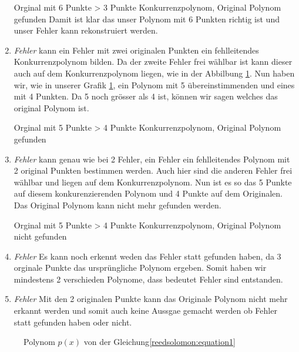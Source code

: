\begin{beispiel}
\begin{enumerate}
        \par Orginal mit 6 Punkte > 3 Punkte Konkurrenzpolynom, Original Polynom gefunden
        Damit ist klar das unser Polynom mit 6 Punkten richtig ist und unser Fehler kann rekonstruiert werden.
    \item \textit{Fehler} kann ein Fehler mit zwei originalen Punkten ein fehlleitendes Konkurrenzpolynom bilden.
        Da der zweite Fehler frei wählbar ist kann dieser auch auf dem Konkurrenzpolynom liegen, wie in der Abbilbung \ref{fig:polynom}.
        Nun haben wir, wie in unserer Grafik \ref{fig:polynom}, ein Polynom mit 5 übereinstimmenden und eines mit 4 Punkten.
        Da 5 noch grösser als 4 ist, können wir sagen welches das original Polynom ist.
        \par Orginal mit 5 Punkte > 4 Punkte Konkurrenzpolynom, Original Polynom gefunden
    \item \textit{Fehler} kann genau wie bei 2 Fehler, ein Fehler ein fehlleitendes Polynom mit 2 original Punkten bestimmen werden.
        Auch hier sind die anderen Fehler frei wählbar und liegen auf dem Konkurrenzpolynom.
        Nun ist es so das 5 Punkte auf diesem konkurenzierenden Polynom und 4 Punkte auf dem Originalen.
        Das Original Polynom kann nicht mehr gefunden werden.
        \par Orginal mit 5 Punkte > 4 Punkte Konkurrenzpolynom, Original Polynom nicht gefunden
    \item \textit{Fehler} Es kann noch erkennt weden das Fehler statt gefunden haben, da 3 orginale Punkte das ursprüngliche Polynom ergeben.
        Somit haben wir mindestens 2 verschieden Polynome, dass bedeutet Fehler sind entstanden.
    \item \textit{Fehler} Mit den 2 originalen Punkte kann das Originale Polynom nicht mehr erkannt werden und 
        somit auch keine Aussgae gemacht werden ob Fehler statt gefunden haben oder nicht.
\end{enumerate}

\begin{figure}%
	\centering
    
	\caption{Polynom $p(x)$ von der Gleichung\eqref{reedsolomon:equation1}}
	\label{fig:polynom}
\end{figure}


\end{beispiel}
